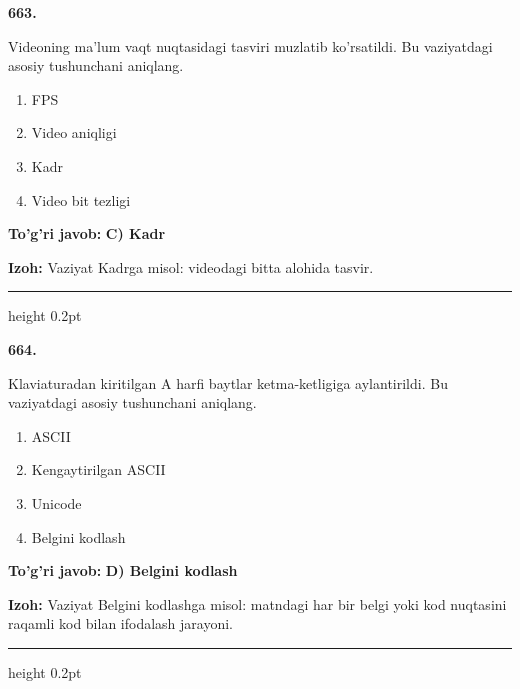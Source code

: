 \documentclass[10pt,a4paper,oneside]{article}
\begin{document}
\noindent\textbf{\color{ink}663.}
\par
Videoning ma'lum vaqt nuqtasidagi tasviri muzlatib ko'rsatildi. Bu vaziyatdagi asosiy tushunchani aniqlang.
\begin{enumerate}[label=\Alph*),leftmargin=9mm]
\item FPS
\item Video aniqligi
\item Kadr
\item Video bit tezligi
\end{enumerate}
\begin{tcolorbox}[enhanced,breakable,colback=teal!4,colframe=teal!50!black,boxrule=0.5pt,arc=1.1mm,left=3mm,right=3mm,top=1.7mm,bottom=1.7mm,before skip=2mm,after skip=2mm]
\textbf{\color{teal}To'g'ri javob:} \textbf{C) Kadr}
\par\smallskip
\textbf{Izoh:} Vaziyat Kadrga misol: videodagi bitta alohida tasvir.
\end{tcolorbox}
\vspace{2mm}\hrule height 0.2pt \vspace{3mm}

\noindent\textbf{\color{ink}664.}
\par
Klaviaturadan kiritilgan A harfi baytlar ketma-ketligiga aylantirildi. Bu vaziyatdagi asosiy tushunchani aniqlang.
\begin{enumerate}[label=\Alph*),leftmargin=9mm]
\item ASCII
\item Kengaytirilgan ASCII
\item Unicode
\item Belgini kodlash
\end{enumerate}
\begin{tcolorbox}[enhanced,breakable,colback=teal!4,colframe=teal!50!black,boxrule=0.5pt,arc=1.1mm,left=3mm,right=3mm,top=1.7mm,bottom=1.7mm,before skip=2mm,after skip=2mm]
\textbf{\color{teal}To'g'ri javob:} \textbf{D) Belgini kodlash}
\par\smallskip
\textbf{Izoh:} Vaziyat Belgini kodlashga misol: matndagi har bir belgi yoki kod nuqtasini raqamli kod bilan ifodalash jarayoni.
\end{tcolorbox}
\vspace{2mm}\hrule height 0.2pt \vspace{3mm}
\end{document}
